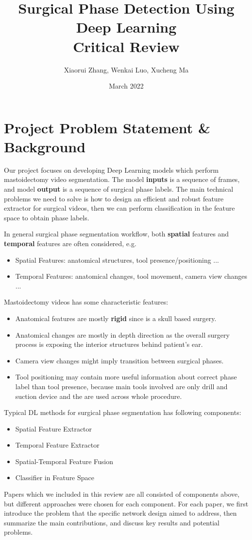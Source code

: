 \documentclass[11pt]{article} \usepackage[top=1in, bottom=1in, left=1in, right=1in]{geometry}
\title{Surgical Phase Detection Using Deep Learning\\ Critical Review}
\author{Xiaorui Zhang, Wenkai Luo, Xucheng Ma}
\date{March 2022}
\begin{document}
\maketitle
\section{Project Problem Statement \& Background}
Our project focuses on developing Deep Learning models which perform mastoidectomy video segmentation. The model \textbf{inputs} is a sequence of frames, and model \textbf{output} is a sequence of surgical phase labels. The main technical problems we need to solve is how to design an efficient and robust feature extractor for surgical videos, then we can perform classification in the feature space to obtain phase labels.

\vspace{0.25cm}
\noindent
In general surgical phase segmentation workflow, both \textbf{spatial} features and \textbf{temporal} features are often considered, e.g.
\begin{itemize}
  \item Spatial Features: anatomical structures, tool presence/positioning ...
  \item Temporal Features: anatomical changes, tool movement, camera view changes​ ...
\end{itemize}
Mastoidectomy videos has some characteristic features:
\begin{itemize}
  \item Anatomical features are mostly \textbf{rigid} since is a skull based surgery.
  \item Anatomical changes are mostly in depth direction as the overall surgery process is exposing the interior structures behind patient's ear.
  \item Camera view changes might imply transition between surgical phases.
  \item Tool positioning may contain more useful information about correct phase label than tool presence, because main tools involved are only drill and suction device and the are used across whole procedure.
\end{itemize}

\vspace{0.25cm}
\noindent
Typical DL methods for surgical phase segmentation has following components:
\begin{itemize}
  \item Spatial Feature Extractor
  \item Temporal Feature Extractor
  \item Spatial-Temporal Feature Fusion
  \item Classifier in Feature Space
\end{itemize}
Papers which we included in this review are all consisted of components above, but different approaches were chosen for each component. For each paper, we first introduce the problem that the specific network design aimed to address, then summarize the main contributions, and discuss key results and potential problems.
\end{document}

